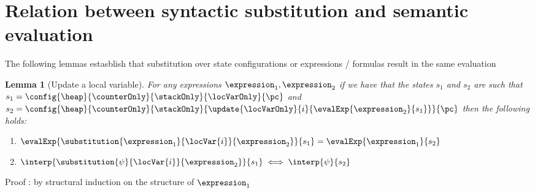\newtheorem{substHeap}{Lemma}[section]
\newtheorem{newHeap}[substHeap]{Lemma}
\newtheorem{substStack}[substHeap]{Lemma}
\newtheorem{substCntr}[substHeap]{Lemma}
\newtheorem{substLv}[substHeap]{Lemma}
\newtheorem{substRet}[substHeap]{Lemma}


\newtheorem{valid}{Definition}[section]

\section{Relation between syntactic substitution and semantic evaluation}\label{substProp}

The following lemmas estasblish that substitution over state configurations or expressions / formulas result in the same evaluation


\begin{substLv}[Update  a local variable]\label{substLv}
For any expressions $ \expression_1, \expression_2 $ 
if we have that the states $s_1$ and $s_2$ are such that
$ s_1 =   \config{\heap}{\counterOnly}{ \stackOnly }{\locVarOnly}{\pc }$ and 
$ s_2 =   \config{\heap}{\counterOnly }{ \stackOnly }{\update{\locVarOnly}{i}{ \evalExp{ \expression_2}{ s_1 } }}{\pc }  $ then 
the following holds:
\begin{enumerate}
      \item $\evalExp{\substitution{\expression_1}{ \locVar{i} }{ \expression_2 }}{ s_1 } = \evalExp{\expression_1}{s_2} $
      \item $\interp{\substitution{\psi}{ \locVar{i} }{ \expression_2 }}{ s_1 } \iff \interp{\psi}{s_2} $
\end{enumerate}
\end{substLv}
Proof : by structural induction on the structure of $\expression_1$ 
